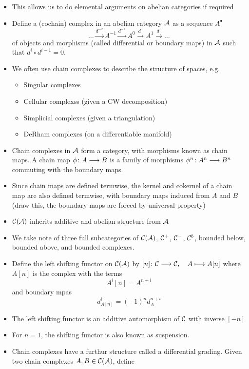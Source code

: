 \documentclass[a4paper]{article}
\begin{document}
\begin{itemize}
\begin{Theorem}
        \end{Theorem}
    \item This allows us to do elemental arguments on abelian categories if required
    \item Define a (cochain) complex in an abelian category $\mathcal{A}$ as a sequence $A^\bullet$
        \[
            \dots \stackrel{d^{-2}}{\to} A^{-1} \stackrel{d^{-1}}{\to} A^{0} \stackrel{d^{0}}{\to} A^1 \stackrel{d^1}{\to} \dots
        \]
        of objects and morphisms (called differential or boundary maps) in $\mathcal{A}$ such that $d^i \circ d^{i-1} = 0$.
    \item We often use chain complexes to describe the structure of spaces, e.g.
        \begin{itemize}
            \item Singular complexes
            \item Cellular complexss (given a CW decomposition)
            \item Simplicial complexes (given a triangulation)
            \item DeRham complexes (on a differentiable manifold)
        \end{itemize}
    \item Chain complexes in $\mathcal{A}$ form a category, with morphisms known as chain maps. A chain map $\phi\colon A\longrightarrow B$ is a family of morphisms $\phi^n\colon A^n\longrightarrow B^n$ commuting with the boundary maps.
    \item Since chain maps are defined termwise, the kernel and cokernel of a chain map are also defined termwise, with boundary maps induced from $A$ and $B$ (draw this, the boundary maps are forced by universal property)
    \item $\mathcal{C}(\mathcal{A})$ inherits additive and abelian structure from $\mathcal{A}$
    \item We take note of three full subcategories of $\mathcal{C}(\mathcal{A})$, $\mathcal{C}^+$, $\mathcal{C}^-$, $\mathcal{C}^b$, bounded below, bounded above, and bounded complexes.
    \item Define the left shifting functor on $\mathcal{C}(\mathcal{A})$ by $[n]\colon\mathcal{C}\longrightarrow \mathcal{C},\quad A\longmapsto A[n]$ where $A[n]$ is the complex with the terms
        \[
            A^i[n] = A^{n+i}
        \]
        and boundary mpas
        \[
            d_{A[n]}^i = (-1)^n d_A^{n+i}
        \]
    \item The left shifting functor is an additive automorphism of $\mathcal{C}$ with inverse $[-n]$
    \item For $n=1$, the shifting functor is also known as suspension.
    \item Chain complexes have a furthur structure called a differential grading. Given two chain complexes $A, B \in \mathcal{C}(\mathcal{A})$, define

\end{itemize}
\end{document}
